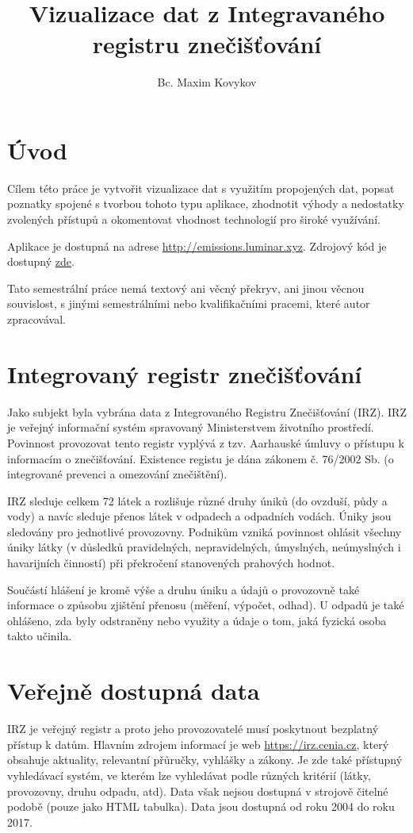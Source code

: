 \documentclass[12pt]{article}
\title{Vizualizace dat z Integravaného registru znečišťování}
\author{Bc. Maxim Kovykov}
\begin{document}
	
\begin{titlepage}
	\maketitle
	\thispagestyle{empty}
\end{titlepage}

\newpage


\section*{Úvod}
Cílem této práce je vytvořit vizualizace dat s využitím propojených dat, popsat poznatky spojené s tvorbou tohoto typu aplikace, zhodnotit výhody a nedostatky zvolených přístupů a okomentovat vhodnost technologií pro široké využívání.

Aplikace je dostupná na adrese \url{http://emissions.luminar.xyz}. Zdrojový kód je dostupný \href{https://github.com/Luminaar/pollution-charts}{zde}.

Tato semestrální práce nemá textový ani věcný překryv, ani jinou věcnou souvislost, s jinými semestrálními nebo kvalifikačními pracemi, které autor zpracovával.


\section*{Integrovaný registr znečišťování}
Jako subjekt byla vybrána data z Integrovaného Registru Znečišťování (IRZ). IRZ je veřejný informační systém spravovaný Ministerstvem životního prostředí. Povinnost provozovat tento registr vyplývá z tzv. Aarhauské úmluvy o přístupu k informacím o znečišťování. Existence registu je dána zákonem č. 76/2002 Sb. (o integrované prevenci a omezování znečištění).

IRZ sleduje celkem 72 látek a rozlišuje různé druhy úniků (do ovzduší, půdy a vody) a navíc sleduje přenos látek v odpadech a odpadních vodách. Úniky jsou sledovány pro jednotlivé provozovny. Podnikům vzniká povinnost ohlásit všechny úniky látky (v důsledků pravidelných, nepravidelných, úmyslných, neúmyslných i havarijních činností) při překročení stanovených prahových hodnot.

Součástí hlášení je kromě výše a druhu úniku a údajů o provozovně také informace o způsobu zjištění přenosu (měření, výpočet, odhad). U odpadů je také ohlášeno, zda byly odstraněny nebo využity a údaje o tom, jaká fyzická osoba takto učinila.


\section*{Veřejně dostupná data}
IRZ je veřejný registr a proto jeho provozovatelé musí poskytnout bezplatný přístup k datům. Hlavním zdrojem informací je web \url{https://irz.cenia.cz}, který obsahuje aktuality, relevantní přůručky, vyhlášky a zákony. Je zde také přístupný vyhledávací systém, ve kterém lze vyhledávat podle různých kritérií (látky, provozovny, druhu odpadu, atd). Data však nejsou dostupná v strojově čitelné podobě (pouze jako HTML tabulka). Data jsou dostupná od roku 2004 do roku 2017.
\end{document}
